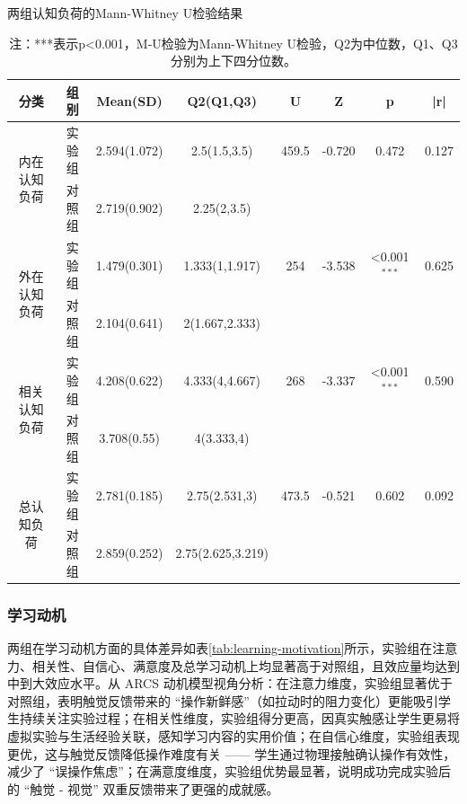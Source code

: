 \documentclass[runningheads]{llncs}
\begin{document}
\begin{table}[t]
\centering
\setlength{\tabcolsep}{2pt} %
\caption{两组认知负荷的Mann-Whitney U检验结果}
\label{tab:cognitive-load}
\begin{tabular}{cccccccc}
\toprule
\textbf{分类} & \textbf{组别} & \textbf{Mean(SD)} & \textbf{Q2(Q1,Q3)} & \textbf{U} & \textbf{Z} & \textbf{p} & \textbf{|r|} \\
\midrule
\multirow{2}{*}{内在认知负荷} 
& 实验组 & 2.594(1.072) & 2.5(1.5,3.5) & 459.5 & -0.720 & 0.472 & 0.127 \\
& 对照组 & 2.719(0.902) & 2.25(2,3.5) &  &  &  &  \\
\multirow{2}{*}{外在认知负荷} 
& 实验组 & 1.479(0.301) & 1.333(1,1.917) & 254 & -3.538 & <0.001\(^{***}\) & 0.625 \\
& 对照组 & 2.104(0.641) & 2(1.667,2.333) &  &  &  &  \\
\multirow{2}{*}{相关认知负荷} 
& 实验组 & 4.208(0.622) & 4.333(4,4.667) & 268 & -3.337 & <0.001\(^{***}\) & 0.590 \\
& 对照组 & 3.708(0.55) & 4(3.333,4) &  &  &  &  \\
\multirow{2}{*}{总认知负荷} 
& 实验组 & 2.781(0.185) & 2.75(2.531,3) & 473.5 & -0.521 & 0.602 & 0.092 \\
& 对照组 & 2.859(0.252) & 2.75(2.625,3.219) &  &  &  &  \\
\bottomrule
\end{tabular}
\caption*{注：***表示p<0.001，M-U检验为Mann-Whitney U检验，Q2为中位数，Q1、Q3分别为上下四分位数。}
\end{table}

\subsubsection{学习动机}
两组在学习动机方面的具体差异如表\ref{tab:learning-motivation}所示，实验组在注意力、相关性、自信心、满意度及总学习动机上均显著高于对照组，且效应量均达到中到大效应水平。从 ARCS 动机模型视角分析：在注意力维度，实验组显著优于对照组，表明触觉反馈带来的 “操作新鲜感”（如拉动时的阻力变化）更能吸引学生持续关注实验过程；在相关性维度，实验组得分更高，因真实触感让学生更易将虚拟实验与生活经验关联，感知学习内容的实用价值；在自信心维度，实验组表现更优，这与触觉反馈降低操作难度有关 —— 学生通过物理接触确认操作有效性，减少了 “误操作焦虑”；在满意度维度，实验组优势最显著，说明成功完成实验后的 “触觉 - 视觉” 双重反馈带来了更强的成就感。
\end{document}
